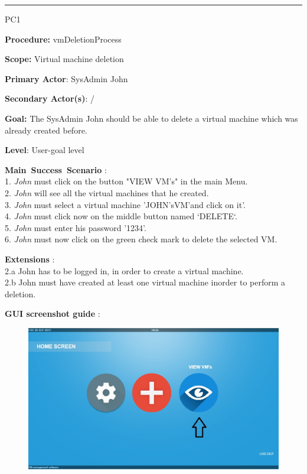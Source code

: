 \hrule
\vspace{0.5cm}
\begin{lyxlist}{PC1}
\small{
\item [\textbf{Procedure:}] vmDeletionProcess
\item [\textbf{Scope:}] Virtual machine deletion
\item [\textbf{Primary Actor}:] SysAdmin John 
\item [\textbf{Secondary Actor(s)}:] /
\item [\textbf{Goal:}] The SysAdmin John should be able to delete a virtual
machine which was already created before.
\item [\textbf{Level}:] User-goal level
\item [\textbf{Main~Success~Scenario}]:\\
1. \emph{John} must click on the button "VIEW VM's" in the main Menu.\\
2. \emph{John} will see all the virtual machines that he created.\\
3. \emph{John} must select a virtual machine 'JOHN'sVM'and click on it'.\\
4. \emph{John} must click now on the middle button named `DELETE`.\\
5. \emph{John} must enter his password '1234'.\\
6. \emph{John} must now click on the green check mark to delete the selected
VM.\\



\item [\textbf{Extensions}]:\\
2.a John has to be logged in, in order to create a virtual machine.\\
2.b John must have created at least one virtual machine inorder to perform a
deletion.\\

\item [\textbf{GUI screenshot guide}]:\\
}

\begin{figure}[H]
\centering
\includegraphics[width=170mm]{images/createVMMod1.eps}
\caption{\label{overflow}}
\end{figure}



\end{lyxlist}
